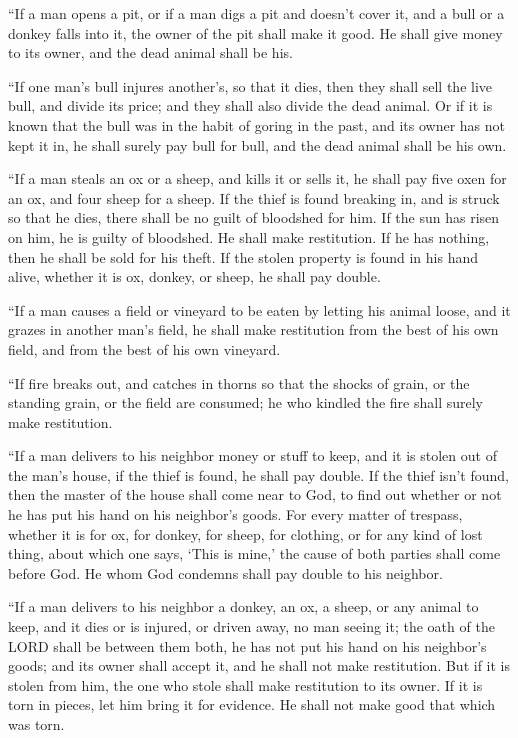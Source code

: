 \myverse{}“If a man opens a pit, or if a man digs a pit and doesn’t cover
it, and a bull or a donkey falls into it,
\myverse{}the owner of the pit shall make it good. He shall give money to its owner,
and the dead animal shall be his.


\myverse{}“If one man’s bull injures another’s, so that it dies, then
they shall sell the live bull, and divide its price; and they shall also divide the dead animal.
\myverse{}Or if it is known that the bull was in the habit of goring in the past, and
its owner has not kept it in, he shall surely pay bull for bull, and the dead animal shall be his own.


\mychapter{} \myverse*{}“If a man steals an ox or a sheep, and kills it or sells it, he
shall pay five oxen for an ox, and four sheep for a sheep.
\myverse{}If the thief is found breaking in, and is struck so that he dies, there shall
be no guilt of bloodshed for him.
\myverse{}If the sun has risen on him, he is guilty of bloodshed. He shall make restitution.
If he has nothing, then he shall be sold for his theft.
\myverse{}If the stolen property is found in his hand alive, whether it is ox, donkey,
or sheep, he shall pay double.


\myverse{}“If a man causes a field or vineyard to be eaten by letting his
animal loose, and it grazes in another man’s field, he shall make restitution from the best of his own
field, and from the best of his own vineyard.


\myverse{}“If fire breaks out, and catches in thorns so that the shocks
of grain, or the standing grain, or the field are consumed; he who kindled the fire shall surely make
restitution.


\myverse{}“If a man delivers to his neighbor money or stuff to keep, and
it is stolen out of the man’s house, if the thief is found, he shall pay double.
\myverse{}If the thief isn’t found, then the master of the house shall come near to God,
to find out whether or not he has put his hand on his neighbor’s goods.
\myverse{}For every matter of trespass, whether it is for ox, for donkey, for sheep,
for clothing, or for any kind of lost thing, about which one says, ‘This is mine,’ the cause of both parties
shall come before God. He whom God condemns shall pay double to his neighbor.


\myverse{}“If a man delivers to his neighbor a donkey, an ox, a sheep,
or any animal to keep, and it dies or is injured, or driven away, no man seeing it;
\myverse{}the oath of the LORD shall be between them both, he has not put his hand
on his neighbor’s goods; and its owner shall accept it, and he shall not make restitution.
\myverse{}But if it is stolen from him, the one who stole shall make restitution to
its owner.
\myverse{}If it is torn in pieces, let him bring it for evidence. He shall not make
good that which was torn.



